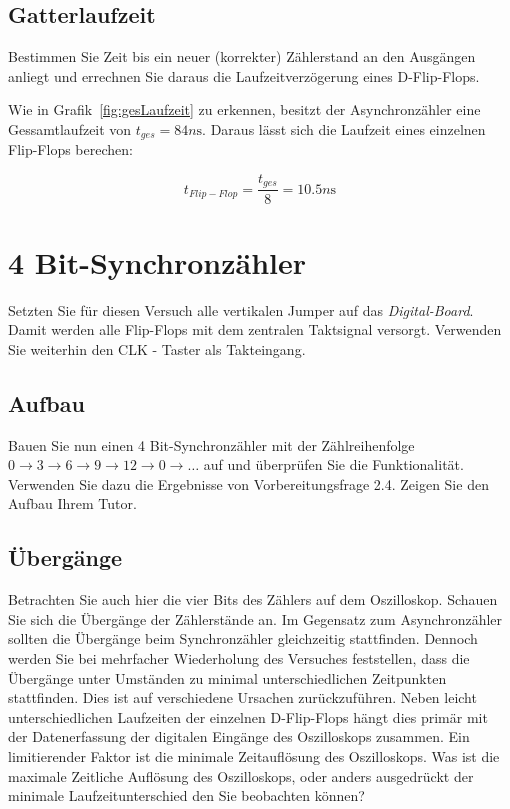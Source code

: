 \documentclass[10pt]{scrreprt}
\begin{document}
    \subsection{Gatterlaufzeit}
    Bestimmen Sie Zeit bis ein neuer (korrekter) Zählerstand an den Ausgängen anliegt und
    errechnen Sie daraus die Laufzeitverzögerung eines D-Flip-Flops.

    Wie in Grafik~\ref{fig:gesLaufzeit} zu erkennen, besitzt der Asynchronzähler
    eine Gessamtlaufzeit von $t_{ges} = 84\si{n\second}$. Daraus lässt sich die Laufzeit eines
    einzelnen Flip-Flops berechen:

    \begin{equation*}
        t_{Flip-Flop} = \frac{t_{ges}}{8} = 10.5\si{n\second}
    \end{equation*}

    \section{4 Bit-Synchronzähler}
    Setzten Sie für diesen Versuch alle vertikalen Jumper auf das \textit{Digital-Board}. Damit werden
    alle Flip-Flops mit dem zentralen Taktsignal versorgt. Verwenden Sie weiterhin den CLK -
    Taster als Takteingang.

    \subsection{Aufbau}
    Bauen Sie nun einen 4 Bit-Synchronzähler mit der Zählreihenfolge $0 \rightarrow 3 \rightarrow 6 \rightarrow 9 \rightarrow 12
    \rightarrow 0 \rightarrow \ldots$ auf und überprüfen Sie die Funktionalität. Verwenden Sie dazu die Ergebnisse
    von Vorbereitungsfrage 2.4. Zeigen Sie den Aufbau Ihrem Tutor.

    \subsection{Übergänge}
    Betrachten Sie auch hier die vier Bits des Zählers auf dem Oszilloskop. Schauen Sie sich
    die Übergänge der Zählerstände an. Im Gegensatz zum Asynchronzähler sollten die
    Übergänge beim Synchronzähler gleichzeitig stattfinden. Dennoch werden Sie bei mehrfacher
    Wiederholung des Versuches feststellen, dass die Übergänge unter Umständen zu minimal
    unterschiedlichen Zeitpunkten stattfinden. Dies ist auf verschiedene Ursachen zurückzuführen.
    Neben leicht unterschiedlichen Laufzeiten der einzelnen D-Flip-Flops hängt dies
    primär mit der Datenerfassung der digitalen Eingänge des Oszilloskops zusammen. Ein
    limitierender Faktor ist die minimale Zeitauflösung des Oszilloskops. Was ist die maximale
    Zeitliche Auflösung des Oszilloskops, oder anders ausgedrückt der minimale Laufzeitunterschied
    den Sie beobachten können?
\end{document}
